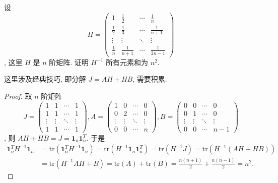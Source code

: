 \documentclass[../../main.tex]{subfiles}%
\begin{document}
\begin{lemma}[Hilbert矩阵逆矩阵元素和]\label{lemma:Hilbert矩阵逆矩阵元素和}
设
\[
H = 
\begin{pmatrix}
1 & \frac{1}{2} & \cdots & \frac{1}{n} \\
\frac{1}{2} & \frac{1}{3} & \cdots & \frac{1}{n + 1} \\
\vdots & \vdots & \ddots & \vdots \\
\frac{1}{n} & \frac{1}{n + 1} & \cdots & \frac{1}{2n - 1}
\end{pmatrix}
\]
, 这里 $H$ 是 $n$ 阶矩阵. 证明 $H^{-1}$ 所有元素和为 $n^{2}$.
\end{lemma}
\begin{note}
这里涉及经典技巧, 即分解 $J = AH + HB$, 需要积累.
\end{note}
\begin{proof}
取 $n$ 阶矩阵
\[
J = 
\begin{pmatrix}
1 & 1 & \cdots & 1 \\
1 & 1 & \cdots & 1 \\
\vdots & \vdots & \ddots & \vdots \\
1 & 1 & \cdots & 1
\end{pmatrix}
,
A = 
\begin{pmatrix}
1 & 0 & \cdots & 0 \\
0 & 2 & \cdots & 0 \\
\vdots & \vdots & \ddots & \vdots \\
0 & 0 & \cdots & n
\end{pmatrix}
,
B = 
\begin{pmatrix}
0 & 0 & \cdots & 0 \\
0 & 1 & \cdots & 0 \\
\vdots & \vdots & \ddots & \vdots \\
0 & 0 & \cdots & n - 1
\end{pmatrix}
\]
,
则 $AH + HB = J = \mathbf{1}_{n}\mathbf{1}_{n}^{T}$. 于是
\begin{align*}
\mathbf{1}_{n}^{T}H^{-1}\mathbf{1}_{n} &= \mathrm{tr}\left(\mathbf{1}_{n}^{T}H^{-1}\mathbf{1}_{n}\right) = \mathrm{tr}\left(H^{-1}\mathbf{1}_{n}\mathbf{1}_{n}^{T}\right) = \mathrm{tr}\left(H^{-1}J\right) = \mathrm{tr}\left(H^{-1}(AH + HB)\right) \\
&= \mathrm{tr}\left(H^{-1}AH + B\right) = \mathrm{tr}(A) + \mathrm{tr}(B) = \frac{n(n + 1)}{2} + \frac{n(n - 1)}{2} = n^{2}.
\end{align*} 
\end{proof}
\end{document}
